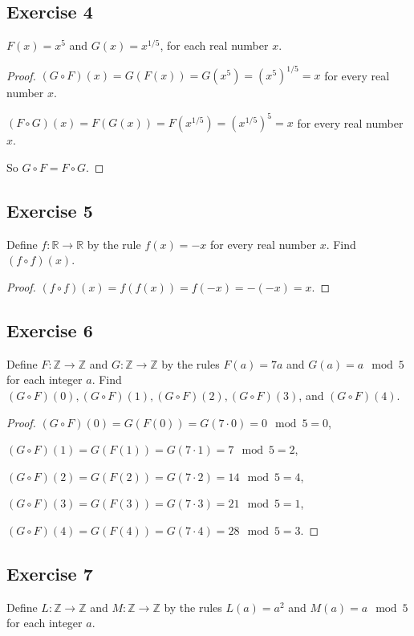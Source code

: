 \documentclass[14pt]{extarticle}
\newcommand{\R}{\mathbb{R}}
\newcommand{\Z}{\mathbb{Z}}
\begin{document}
\subsection{Exercise 4}
\(F(x) = x^5\) and \(G(x) = x^{1/5}\), for each real number $x$.

\begin{proof}
    \((G \circ F)(x) = G(F(x)) = G(x^5) = (x^5)^{1/5} = x\) for every real number $x$.

    \((F \circ G)(x) = F(G(x)) = F(x^{1/5}) = (x^{1/5})^5 = x\) for every real number $x$.

    So \(G \circ F = F \circ G\).
\end{proof}

\subsection{Exercise 5}
Define \(f: \R \to \R\) by the rule \(f(x) = -x\) for every real number $x$. Find \((f \circ f)(x)\).

\begin{proof}
    \((f \circ f)(x) = f(f(x)) = f(-x) = -(-x) = x\).
\end{proof}

\subsection{Exercise 6}
Define \(F: \Z \to \Z\) and \(G: \Z \to \Z\) by the rules \(F(a) = 7a\) and \(G(a) = a \mod 5\) for each integer $a$.
Find \((G \circ F)(0), (G \circ F)(1), (G \circ F)(2), (G \circ F)(3)\), and \((G \circ F)(4)\).

\begin{proof}
    \((G \circ F)(0) = G(F(0)) = G(7 \cdot 0) = 0 \mod 5 = 0\),

    \((G \circ F)(1) = G(F(1)) = G(7 \cdot 1) = 7 \mod 5 = 2\),

    \((G \circ F)(2) = G(F(2)) = G(7 \cdot 2) = 14 \mod 5 = 4\),

    \((G \circ F)(3) = G(F(3)) = G(7 \cdot 3) = 21 \mod 5 = 1\),

    \((G \circ F)(4) = G(F(4)) = G(7 \cdot 4) = 28 \mod 5 = 3\).
\end{proof}

\subsection{Exercise 7}
Define \(L: \Z \to \Z\) and \(M: \Z \to \Z\) by the rules \(L(a) = a^2\) and \(M(a) = a \mod 5\) for each integer $a$.
\end{document}
